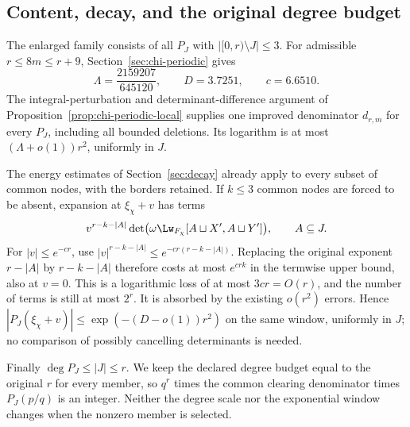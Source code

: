 \subsection{Content, decay, and the original degree budget}
The enlarged family consists of all $P_J$ with $|[0,r)\setminus J|\le3$.
For admissible $r\le8m\le r+9$, Section~\ref{sec:chi-periodic} gives
\[
 \Lambda=\frac{2159207}{645120},\qquad D=3.7251,\qquad c=6.6510.
\]
The integral-perturbation and determinant-difference argument of
Proposition~\ref{prop:chi-periodic-local} supplies one improved denominator
$d_{r,m}$ for every $P_J$, including all bounded deletions. Its logarithm
is at most $(\Lambda+o(1))r^2$, uniformly in $J$.

The energy estimates of Section~\ref{sec:decay} already apply to every
subset of common nodes, with the borders retained. If $k\le3$ common
nodes are forced to be absent, expansion at $\xi_\chi+v$ has terms
\[
 v^{r-k-|A|}\det\bigl(\omega\Lw_{F_\chi}[A\sqcup X',A\sqcup Y']\bigr),
 \qquad A\subseteq J.
\]
For $|v|\le e^{-cr}$, use
$|v|^{r-k-|A|}\le e^{-cr(r-k-|A|)}$. Replacing the original exponent
$r-|A|$ by $r-k-|A|$ therefore costs at most $e^{crk}$ in the termwise
upper bound, also at $v=0$. This is
a logarithmic loss of at most $3cr=O(r)$, and the number of terms is
still at most $2^r$. It is absorbed by the existing $o(r^2)$ errors.
Hence $|P_J(\xi_\chi+v)|\le\exp(-(D-o(1))r^2)$ on the same window,
uniformly in $J$; no comparison of possibly cancelling determinants is
needed.

Finally $\deg P_J\le|J|\le r$. We keep the declared degree budget equal
to the original $r$ for every member, so $q^r$ times the common clearing
denominator times $P_J(p/q)$ is an integer. Neither the degree scale nor
the exponential window changes when the nonzero member is selected.
